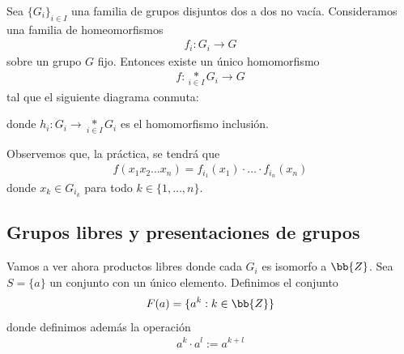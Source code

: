 \begin{lema}
    Sea $\{G_i\}_{i\in I}$ una familia de grupos disjuntos dos a dos no vacía. Consideramos una familia de homeomorfismos
    \begin{gather*}
        f_i: G_i \to G
    \end{gather*}
    sobre un grupo $G$ fijo. Entonces existe un único homomorfismo
    \begin{gather*}
        f : \underset{i\in I}{\ast} G_i \to G
    \end{gather*}
    tal que el siguiente diagrama conmuta:
    \begin{center}
    \end{center}
    donde $h_{i}:G_{i}\to \underset{i\in I}{\ast} G_i$ es el homomorfismo inclusión.
\end{lema}

Observemos que, la práctica, se tendrá que 
\begin{gather*}
    f(x_1x_2\ldots x_n) = f_{i_1}(x_1) \cdot \ldots \cdot f_{i_n}(x_n)
\end{gather*}
donde $x_k \in G_{i_k}$ para todo $k\in \{1,\ldots,n\}$.

\subsection{Grupos libres y presentaciones de grupos}

Vamos a ver ahora productos libres donde cada $G_i$ es isomorfo a $\bb{Z}$. Sea $S=\{a\}$ un conjunto con un único elemento. Definimos el conjunto
\begin{gather*}
    F(a)=\{a^k : k\in \bb{Z}\}
\end{gather*}
donde definimos además la operación 
\begin{gather*}
    a^k \cdot a^l := a^{k+l}
\end{gather*}

